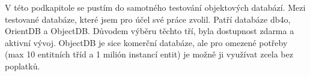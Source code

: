 V této podkapitole se pustím do samotného testování objektových databází. Mezi testované databáze, které jsem pro účel své práce zvolil. Patří databáze db4o, OrientDB a ObjectDB. Důvodem výběru těchto tří, byla dostupnost zdarma a aktivní vývoj. ObjectDB je sice komerční databáze, ale pro omezené potřeby (max 10 entitních tříd a 1 milión instancí entit) je možně ji využívat zcela bez poplatků.

